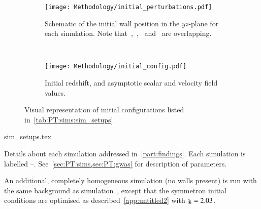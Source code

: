     \begin{figure}[ht]
        \centering
        \begin{subfigure}[t]{0.62\linewidth}
            \centering
            \texttt{[image: Methodology/initial\_perturbations.pdf]}
            \caption{Schematic of the initial wall position in the $yz$-plane for each simulation. Note that~,~,~ and~ are overlapping.} %
            \label{fig:PT:sims:intital_perturbations}
        \end{subfigure}
        ~
        \begin{subfigure}[t]{0.32\linewidth}
            \centering
            \texttt{[image: Methodology/initial\_config.pdf]}
            \caption{Initial redshift, and asymptotic scalar and velocity field values.}
            \label{fig:PT:sims:initial_config}
        \end{subfigure}
        \caption{Visual representation of initial configurations listed in~\cref{tab:PT:sims:sim_setups}.}
        \label{fig:PT:sims:initial_configs}
    \end{figure}


    \begin{table}[h]
        {sim_setups.tex}
        \caption{Details about each simulation addressed in~\cref{part:findings}. Each simulation is labelled --. See~\cref{sec:PT:sims,sec:PT:gwas} for description of parameters.} %
        \label{tab:PT:sims:sim_setups}
    \end{table}



    An additional, completely homogeneous simulation (no walls present) is run with the same background as simulation~, except that the symmetron initial conditions are optimised as described~\cref{app:untitled2} with $\mathfrak{z}_\mathrm{i}=2.03$. %
    
    





